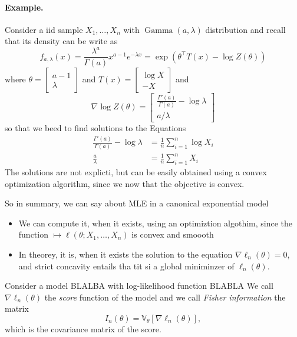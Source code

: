 \documentclass[
	fontsize=11pt, %
	twoside=false, %
	numbers=noenddot, %
]{kaobook}
\DeclareMathOperator{\gam}{Gamma}
\newcommand{\var}{\mathbb V}
\newcommand{\grad}{\nabla}
\begin{document}
\paragraph{Example.}

Consider a iid sample $X_1, \ldots, X_n$ with $\gam(a, \lambda)$ distribution and recall that its density can be write as
\begin{equation*}
	f_{a, \lambda}(x) = \frac{\lambda^a}{\Gamma(a)} x^{a - 1} e^{-\lambda x}
	= \exp(\theta^\top T(x) - \log Z(\theta))
\end{equation*}
where $\theta = \begin{bmatrix} a - 1 \\ \lambda \end{bmatrix}$ and $T(x) = \begin{bmatrix} \log X\\ -X \end{bmatrix}$ and
\begin{equation*}
	\grad \log Z(\theta) = 
	\begin{bmatrix}
	\frac{\Gamma'(a)}{\Gamma(a)} - \log \lambda \\
	a / \lambda	
	\end{bmatrix}
\end{equation*}
so that we beed to find solutions to the Equations
\begin{align*}
	\frac{\Gamma'(a)}{\Gamma(a)} - \log \lambda &= \frac{1}{n} \sum_{i=1}^n \log X_i  \\
	\frac {a}{\lambda} &= \frac{1}{n} \sum_{i=1}^n X_i 
\end{align*}
The solutions are not explicti, but can be easily obtained using a convex optimization algorithm, since we now that the objective is convex.


So in summary, we can say about MLE in a canonical exponential model
\begin{itemize}
	\item We can compute it, when it exists, using an optimiztion algothim, since the function $\mapsto \ell(\theta ; X_1, \ldots, X_n)$ is convex and smoooth
	\item In theorey, it is, when it exists the solution to the equation $\grad \ell_n(\theta) = 0$, and strict concavity entails tha tit si a global miniminzer of $\ell_n(\theta)$.
\end{itemize}


\begin{definition}
	Consider a model BLALBA with log-likelihood function BLABLA
	We call $\grad \ell_n(\theta)$ the \emph{score} function of the model and we call \emph{Fisher information} the matrix
	\begin{equation*}
		I_n(\theta) = \var_\theta[ \grad \ell_n(\theta) ],
	\end{equation*}
	which is the covariance matrix of the score.
\end{definition}
\end{document}
